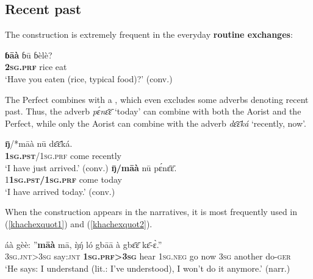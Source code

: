 \documentclass[output=paper]{LSP/langsci}
\begin{document}
\subsection{Recent past}

The  construction is extremely frequent in the everyday \textbf{routine exchanges}:

\begin{exe} \ex
\gll	\textbf{ɓāà}	ɓū	ɓèlè?					\\
	\textbf{2\textsc{sg}.\textsc{prf}}	rice	eat					\\
\glt ‘Have you eaten (rice, typical food)?’ (conv.)
\end{exe}

The Perfect combines with a , which even excludes some adverbs denoting recent past. Thus, the adverb \textit{pɛ́nɛ̄ɛ̄} `today' can combine with both the Aorist and the Perfect, while only the Aorist can combine with the adverb \textit{dɛ̄ɛ̄ká} ‘recently, now’.

\begin{exe} \ex
\begin{xlist} \ex
\label{khachexdeeka}
\gll	\textbf{ŋ̄}/*māà	nū	dɛ̄ɛ̄ká.	\\
		\textbf{1\textsc{sg}.\textsc{pst}}/1\textsc{sg}.\textsc{prf}	come	recently	\\
\glt ‘I have just arrived.’ (conv.)
\ex
\label{khachexpenee}
\gll \textbf{ŋ̄/māà}	nū	pɛ́nɛ̄ɛ̄.		\\
		1\textbf{1\textsc{sg}.\textsc{pst}/1\textsc{sg}.\textsc{prf}}	come	today \\	
\glt ‘I have arrived today.’ (conv.)
\end{xlist}
\end{exe}

When the  construction appears in the narratives, it is most frequently used in  (\ref{khachexquot1}) and  (\ref{khachexquot2}).

\begin{exe} \ex
\label{khachexquot1}
\gll	áà	gèè:	”\textbf{māà}	mā,	ŋ̀ŋ́	ló	gbāā à	gbɛ̄ɛ̄	kɛ̄-ɛ̀.”\\
3\textsc{sg}.\textsc{jnt}>3\textsc{sg}	say:\textsc{jnt}	\textbf{1\textsc{sg}.\textsc{prf}>3\textsc{sg}}	hear	1\textsc{sg}.\textsc{neg}	go	now 3\textsc{sg}	another	    do-\textsc{ger}\\
\glt ‘He says: I understand (lit.: I've understood), I won’t do it anymore.’ (narr.)
\end{exe}
\end{document}
